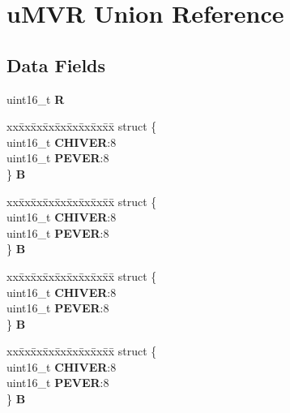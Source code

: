 \hypertarget{unionuMVR}{}\section{u\+M\+VR Union Reference}
\label{unionuMVR}
\subsection*{Data Fields}
\begin{DoxyCompactItemize}
\item 
\mbox{\label{unionuMVR_a08f320521d60d87a07bad35a13003fa1}} 
uint16\+\_\+t {\bfseries R}
\item 
\mbox{\label{unionuMVR_a33d1f55600dfb9a0b7a537cdb6c82013}} 
\begin{tabbing}
xx\=xx\=xx\=xx\=xx\=xx\=xx\=xx\=xx\=\kill
struct \{\\
\>uint16\_t {\bfseries CHIVER}:8\\
\>uint16\_t {\bfseries PEVER}:8\\
\} {\bfseries B}\\

\end{tabbing}\item 
\mbox{\label{unionuMVR_accdb2d03554196fe3fdc7eab953f4992}} 
\begin{tabbing}
xx\=xx\=xx\=xx\=xx\=xx\=xx\=xx\=xx\=\kill
struct \{\\
\>uint16\_t {\bfseries CHIVER}:8\\
\>uint16\_t {\bfseries PEVER}:8\\
\} {\bfseries B}\\

\end{tabbing}\item 
\mbox{\label{unionuMVR_ae19371febdf09dc792c8cd2b7198f3ed}} 
\begin{tabbing}
xx\=xx\=xx\=xx\=xx\=xx\=xx\=xx\=xx\=\kill
struct \{\\
\>uint16\_t {\bfseries CHIVER}:8\\
\>uint16\_t {\bfseries PEVER}:8\\
\} {\bfseries B}\\

\end{tabbing}\item 
\mbox{\label{unionuMVR_ae1c8a237c8e71041b5f97c17cb43abdc}} 
\begin{tabbing}
xx\=xx\=xx\=xx\=xx\=xx\=xx\=xx\=xx\=\kill
struct \{\\
\>uint16\_t {\bfseries CHIVER}:8\\
\>uint16\_t {\bfseries PEVER}:8\\
\} {\bfseries B}\\

\end{tabbing}\end{DoxyCompactItemize}


